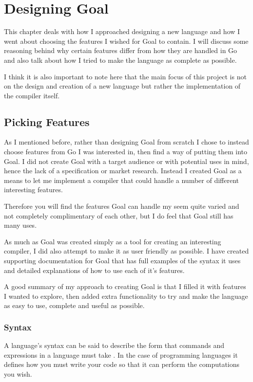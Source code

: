\chapter{Designing Goal}

This chapter deals with how I approached designing a new language and how I went about choosing the features I wished for Goal to contain. I will discuss some reasoning behind why certain features differ from how they are handled in Go and also talk about how I tried to make the language as complete as possible.

I think it is also important to note here that the main focus of this project is not on the design and creation of a new language but rather the implementation of the compiler itself.

\section{Picking Features}

As I mentioned before, rather than designing Goal from scratch I chose to instead choose features from Go I was interested in, then find a way of putting them into Goal. I did not create Goal with a target audience or with potential uses in mind, hence the lack of a specification or market research. Instead I created Goal as a means to let me implement a compiler that could handle a number of different interesting features.

Therefore you will find the features Goal can handle my seem quite varied and not completely complimentary of each other, but I do feel that Goal still has many uses. 

As much as Goal was created simply as a tool for creating an interesting compiler, I did also attempt to make it as user friendly as possible. I have created supporting documentation for Goal that has full examples of the syntax it uses and detailed explanations of how to use each of it's features.  
 
A good summary of my approach to creating Goal is that I filled it with features I wanted to explore, then added extra functionality to try and make the language as easy to use, complete and useful as possible.
 
\subsection{Syntax}

A language's syntax can be said to describe the form that commands and expressions in a language must take \cite[p.~72]{CompGen1997}. In the case of programming languages it defines how you must write your code so that it can perform the computations you wish.

